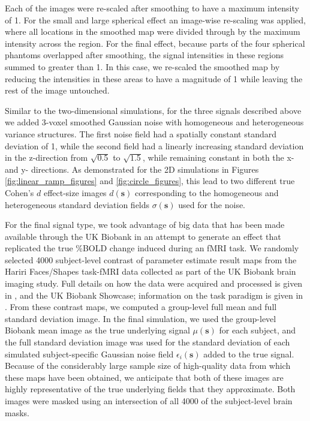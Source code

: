 Each of the images were re-scaled after smoothing to have a maximum intensity of 1. For the small and large spherical effect an image-wise re-scaling was applied, where all locations in the smoothed map were divided through by the maximum intensity across the region. For the final effect, because parts of the four spherical phantoms overlapped after smoothing, the signal intensities in these regions summed to greater than 1. In this case, we re-scaled the smoothed map by reducing the intensities in these areas to have a magnitude of 1 while leaving the rest of the image untouched. 

Similar to the two-dimensional simulations, for the three signals described above we added 3-voxel smoothed Gaussian noise with homogeneous and heterogeneous variance structures. The first noise field had a spatially constant standard deviation of 1, while the second field had a linearly increasing standard deviation in the z-direction from $\sqrt{0.5}$ to $\sqrt{1.5}$, while remaining constant in both the x- and y- directions. As demonstrated for the 2D simulations in Figures \ref{fig:linear_ramp_figures} and \ref{fig:circle_figures}, this lead to two different true Cohen's $d$ effect-size images $d(\bm{s})$ corresponding to the homogeneous and heterogeneous standard deviation fields $\sigma(\bm{s})$ used for the noise.

For the final signal type, we took advantage of big data that has been made available through the UK Biobank in an attempt to generate an effect that replicated the true \%BOLD change induced during an fMRI task. We randomly selected 4000 subject-level contrast of parameter estimate result maps from the Hariri Faces/Shapes task-fMRI data collected as part of the UK Biobank brain imaging study. Full details on how the data were acquired and processed is given in \textit{\citet{Miller2016-hd}}, \textit{\citet{Alfaro-Almagro2018-ip}} and the UK Biobank Showcase; information on the task paradigm is given in \textit{\citet{Hariri2002-ns}}. From these contrast maps, we computed a group-level full mean and full standard deviation image. In the final simulation, we used the group-level Biobank mean image as the true underlying signal $\mu(\bm{s})$ for each subject, and the full standard deviation image was used for the standard deviation of each simulated subject-specific Gaussian noise field $\epsilon_{i}(\bm{s})$ added to the true signal. Because of the considerably large sample size of high-quality data from which these maps have been obtained, we anticipate that both of these images are highly representative of the true underlying fields that they approximate. Both images were masked using an intersection of all 4000 of the subject-level brain masks.

